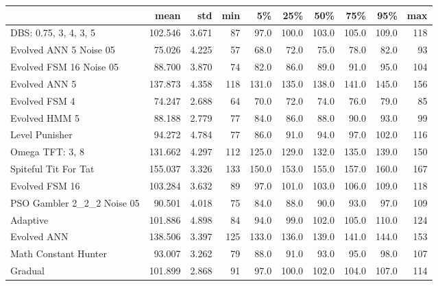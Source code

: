 \begin{tabular}{lrrrrrrrrr}
\toprule
{} &     mean &    std &  min &     5\% &    25\% &    50\% &    75\% &    95\% &  max \\
\midrule
DBS: 0.75, 3, 4, 3, 5      &  102.546 &  3.671 &   87 &   97.0 &  100.0 &  103.0 &  105.0 &  109.0 &  118 \\
Evolved ANN 5 Noise 05     &   75.026 &  4.225 &   57 &   68.0 &   72.0 &   75.0 &   78.0 &   82.0 &   93 \\
Evolved FSM 16 Noise 05    &   88.700 &  3.870 &   74 &   82.0 &   86.0 &   89.0 &   91.0 &   95.0 &  104 \\
Evolved ANN 5              &  137.873 &  4.358 &  118 &  131.0 &  135.0 &  138.0 &  141.0 &  145.0 &  156 \\
Evolved FSM 4              &   74.247 &  2.688 &   64 &   70.0 &   72.0 &   74.0 &   76.0 &   79.0 &   85 \\
Evolved HMM 5              &   88.188 &  2.779 &   77 &   84.0 &   86.0 &   88.0 &   90.0 &   93.0 &   99 \\
Level Punisher             &   94.272 &  4.784 &   77 &   86.0 &   91.0 &   94.0 &   97.0 &  102.0 &  116 \\
Omega TFT: 3, 8            &  131.662 &  4.297 &  112 &  125.0 &  129.0 &  132.0 &  135.0 &  139.0 &  150 \\
Spiteful Tit For Tat       &  155.037 &  3.326 &  133 &  150.0 &  153.0 &  155.0 &  157.0 &  160.0 &  167 \\
Evolved FSM 16             &  103.284 &  3.632 &   89 &   97.0 &  101.0 &  103.0 &  106.0 &  109.0 &  118 \\
PSO Gambler 2\_2\_2 Noise 05 &   90.501 &  4.018 &   75 &   84.0 &   88.0 &   90.0 &   93.0 &   97.0 &  109 \\
Adaptive                   &  101.886 &  4.898 &   84 &   94.0 &   99.0 &  102.0 &  105.0 &  110.0 &  124 \\
Evolved ANN                &  138.506 &  3.397 &  125 &  133.0 &  136.0 &  139.0 &  141.0 &  144.0 &  153 \\
Math Constant Hunter       &   93.007 &  3.262 &   79 &   88.0 &   91.0 &   93.0 &   95.0 &   98.0 &  107 \\
Gradual                    &  101.899 &  2.868 &   91 &   97.0 &  100.0 &  102.0 &  104.0 &  107.0 &  114 \\
\bottomrule
\end{tabular}
